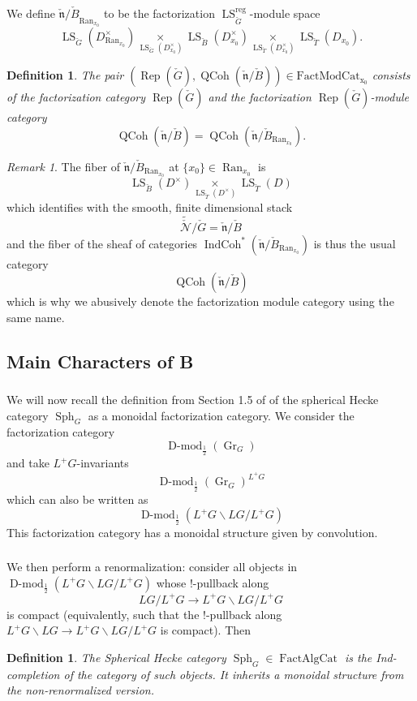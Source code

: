 \documentclass[10pt]{amsart}
\newtheorem{defn}[subsubsection]{Definition}
\theoremstyle{remark}
\newtheorem{rem}[subsubsection]{Remark}
\newcommand{\on}[1]{\operatorname{#1}}
\newcommand{\Dmodh}{\on{D-mod}_{\frac{1}{2}}}
\newcommand{\QCoh}{\on{QCoh}}
\newcommand{\IndCoh}{\on{IndCoh}}
\newcommand{\Gcheck}{\check{G}}
\newcommand{\ncheck}{\check{\mathfrak{n}}}
\newcommand{\Bcheck}{\check{B}}
\newcommand{\Tcheck}{\check{T}}
\newcommand{\Ran}{\on{Ran}}
\newcommand{\FactAlgCat}{\on{FactAlgCat}}
\newcommand{\FactModCat}{\on{FactModCat_{x_0}}}
\newcommand{\sssec}[1]{\subsubsection{}}
\begin{document}
We define ${\ncheck/\Bcheck}_{\Ran_{x_0}}$ to be the factorization $\on{LS}_{\Gcheck}^{\on{reg}}$-module space
$$
\on{LS}_{\Gcheck}(D_{\Ran_{x_0}}^{\times}) \underset{\on{LS}_{\Gcheck}(D_{x_0}^{\times})}{\times} \on{LS}_{\Bcheck}(D_{x_0}^{\times}) \underset{\on{LS}_{\Tcheck}(D_{x_0}^{\times})}{\times} \on{LS}_{\Tcheck}(D_{x_0}).
$$

\begin{defn}
    The pair $(\on{Rep}(\Gcheck), \QCoh(\ncheck/\Bcheck)) \in \FactModCat$ consists of the factorization category $\on{Rep}(\Gcheck)$ and the factorization $\on{Rep}(\Gcheck)$-module category
    $$
        \QCoh(\ncheck/\Bcheck) = \QCoh(\ncheck/\Bcheck_{\Ran_{x_0}}).
    $$
\end{defn}

\begin{rem}
    The fiber of $\ncheck/\Bcheck_{\Ran_{x_0}}$ at $\{x_0\} \in \Ran_{x_0}$ is
    $$
        \on{LS}_{\Bcheck}(D^{\times}) \underset{\on{LS}_{\Tcheck}(D^{\times})}{\times} \on{LS}_{\Tcheck}(D)
    $$
    which identifies with the smooth, finite dimensional stack
    $$
    \tilde{\check{\mathcal{N}}}/\check{G} = \ncheck/\Bcheck
    $$
    and the fiber of the sheaf of categories $\IndCoh^*(\ncheck/\Bcheck_{\Ran_{x_0}})$ is thus the usual category
    $$
    \QCoh(\ncheck/\Bcheck)
    $$
    which is why we abusively denote the factorization module category using the same name.
\end{rem}

\subsection{Main Characters of B} \label{Main Characters of B}

\sssec{}
We will now recall the definition from Section 1.5 of \cite{GLC2} of the spherical Hecke category $\on{Sph}_G$ as a monoidal factorization category. We consider the factorization category
$$
\Dmodh(\on{Gr}_{G})
$$
and take $L^+G$-invariants
$$
\Dmodh(\on{Gr}_{G})^{L^+G}
$$
which can also be written as
$$
\Dmodh(L^+G \backslash LG / L^+G)
$$
This factorization category has a monoidal structure given by convolution. 

\sssec{}
We then perform a renormalization: consider all objects in $\Dmodh(L^+G \backslash LG / L^+G)$ whose $!$-pullback along
$$
LG / L^+G \to L^+G \backslash LG/L^+G
$$
is compact (equivalently, such that the $!$-pullback along $L^+G \backslash LG \to L^+G \backslash LG/L^+G$ is compact). Then

\begin{defn}
    The Spherical Hecke category $\on{Sph}_G \in \FactAlgCat$ is the Ind-completion of the category of such objects. It inherits a monoidal structure from the non-renormalized version.
\end{defn}
\end{document}
